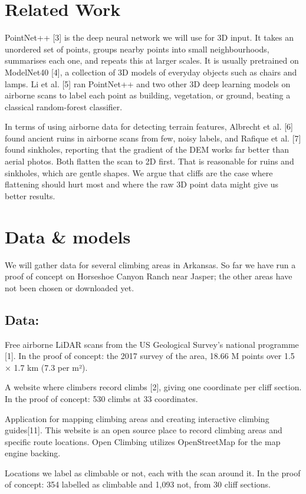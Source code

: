\documentclass{mva2011}
\begin{document}
\section{Related Work}

PointNet++ [3] is the deep neural network we will use for 3D input. It takes an unordered set of points, groups nearby points into small neighbourhoods, summarises each one, and repeats this at larger scales.  It is usually pretrained on ModelNet40 [4], a collection of 3D models of everyday objects such as chairs and lamps. Li et al. [5] ran PointNet++ and two other 3D deep learning models on airborne scans to label each point as building, vegetation, or ground, beating a classical random-forest classifier.

In terms of using airborne data for detecting terrain features, Albrecht et al. [6] found ancient ruins in airborne scans from few, noisy labels, and Rafique et al. [7] found sinkholes, reporting that the gradient of the DEM works far better than aerial photos. Both flatten the scan to 2D first. That is reasonable for ruins and sinkholes, which are gentle shapes. We argue that cliffs are the case where flattening should hurt most and where the raw 3D point data might give us better results.

\section{Data \& models}

We will gather data for several climbing areas in Arkansas. So far we have run a proof of concept on Horseshoe Canyon Ranch near Jasper; the other areas have not been chosen or downloaded yet.
\subsection{Data:}
    \begin{description}
    \item[USGS 3DEP scans:] 
    Free airborne LiDAR scans from the US Geological Survey's national programme [1]. In the proof of concept: the 2017 survey of the area, 18.66 M points over 1.5 × 1.7 km (7.3 per m²).
    \item[Mountain Project:] 
    A website where climbers record climbs [2], giving one coordinate per cliff section. In the proof of concept: 530 climbs at 33 coordinates.
    \item[Open Climbing:]
    \item  Application for mapping climbing areas and creating interactive climbing guides[11]. This website is an open source place to record climbing areas and specific route locations. Open Climbing utilizes OpenStreetMap for the map engine backing. 
    \item[Training examples:] 
    Locations we label as climbable or not, each with the scan around it. In the proof of concept: 354 labelled as climbable and 1,093 not, from 30 cliff sections.
    \end{description}
    
\end{document}
